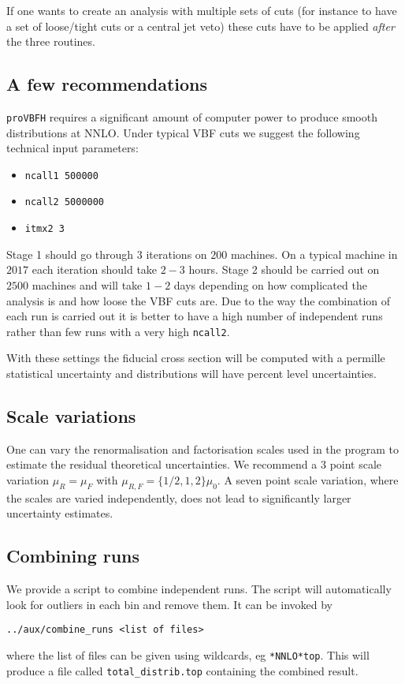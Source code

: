 \documentclass[12pt,a4]{article}
\newcommand{\provbfh}{\texttt{proVBFH}\xspace}
\begin{document}
If one wants to create an analysis with multiple sets of cuts (for
instance to have a set of loose/tight cuts or a central jet veto) these
cuts have to be applied \emph{after} the three routines.

\subsection{A few recommendations}
\provbfh requires a significant amount of computer power to produce
smooth distributions at NNLO.
%
Under typical VBF cuts we suggest the following technical input
parameters:

\begin{itemize}
\item \texttt{ncall1 500000}
\item \texttt{ncall2 5000000}
\item \texttt{itmx2 3}
\end{itemize}

Stage 1 should go through $3$ iterations on $200$ machines.
%
On a typical machine in $2017$ each iteration should take $2-3$ hours.
%
Stage 2 should be carried out on $2500$ machines and will take $1-2$
days depending on how complicated the analysis is and how loose the
VBF cuts are.
%
Due to the way the combination of each run is carried out it is better
to have a high number of independent runs rather than few runs with a
very high \texttt{ncall2}.

With these settings the fiducial cross section will be computed with a
permille statistical uncertainty and distributions will have percent
level uncertainties.

\subsection{Scale variations}
One can vary the renormalisation and factorisation scales used in
the program to estimate the residual theoretical uncertainties.
%
We recommend a $3$ point scale variation $\mu_R=\mu_F$ with
$\mu_{R,F}=\{1/2,1,2\}\mu_0$.
%
A seven point scale variation, where the scales are varied
independently, does not lead to significantly larger uncertainty
estimates.

\subsection{Combining runs}
We provide a script to combine independent runs.
%
The script will automatically look for outliers in each bin and remove
them.
%
It can be invoked by
%
\begin{verbatim}
../aux/combine_runs <list of files>
\end{verbatim}
%
where the list of files can be given using wildcards, eg
\texttt{*NNLO*top}.
%
This will produce a file called \texttt{total\_distrib.top} containing
the combined result.
\end{document}
